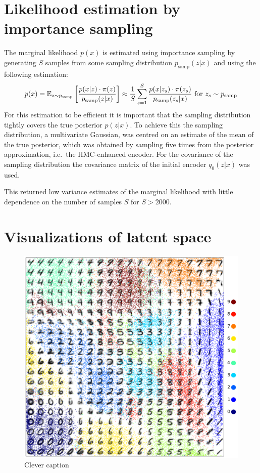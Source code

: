 \begin{appendices}

\section{Likelihood estimation by importance sampling}
\label{app:NLLestimateImportSampling}

The marginal likelihood $p(x)$ is estimated using importance sampling by generating $S$ samples from some sampling distribution $p_\textrm{samp}(z|x)$ and using the following estimation:
\begin{equation}
p(x) = \mathbb{E}_{z \sim p_\textrm{samp}} \left[\frac{p(x|z) \cdot \pi(z)}{p_\textrm{samp}(z|x)} \right] \approx \frac{1}{S} \sum_{s=1}^S \frac{p(x|z_s) \cdot \pi(z_s)}{p_\textrm{samp}(z_s|x)} \textrm{ for } z_s \sim p_\textrm{samp}
\end{equation}
For this estimation to be efficient it is important that the sampling distribution tightly covers the true posterior $p(z|x)$. To achieve this the sampling distribution, a multivariate Gaussian, was centred on an estimate of the mean of the true posterior, which was obtained by sampling five times from the posterior approximation, i.e.\ the HMC-enhanced encoder. For the covariance of the sampling distribution the covariance matrix of the initial encoder $q_0(z|x)$ was used.

This returned low variance estimates of the marginal likelihood with little dependence on the number of samples $S$ for $S > 2000$.

\section{Visualizations of latent space}

\begin{figure}[hb]
\centering
\includegraphics[width=\columnwidth]{figures/learned_representation_train_points_small.pdf}
\caption{Clever caption}
\label{fig:2d_latent_visualization}
\end{figure}


\end{appendices}
